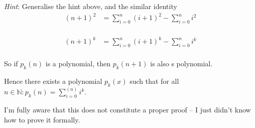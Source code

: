 \documentclass[10pt,\jkfside,a4paper]{article}
\begin{document}
\begin{enumerate}
\begin{enumerate}
\textit{Hint}: Generalise the hint above, and the similar identity
\begin{equation}
\begin{split}
(n + 1)^2 &= \sum^n_{i = 0}(i + 1)^2 - \sum^n_{i = 0}i^2\\
\end{split}
\end{equation}

\begin{equation}
\begin{split}
(n + 1)^k &= \sum^n_{i = 0} (i + 1)^k - \sum^n_{i = 0} i^k\\
\end{split}
\end{equation}

So if $p_k(n)$ is a polynomial, then $p_k(n + 1)$ is also s polynomial.

Hence there exists a polynomial $p_k(x)$ such that for all $n \in \mathbb{N}: p_k(n) = \sum^(n)_{i = 0} i^k$.

I'm fully aware that this does not constitute a proper proof -- I just didn't know how to prove it formally.

\end{enumerate}

\end{enumerate}
\end{document}
